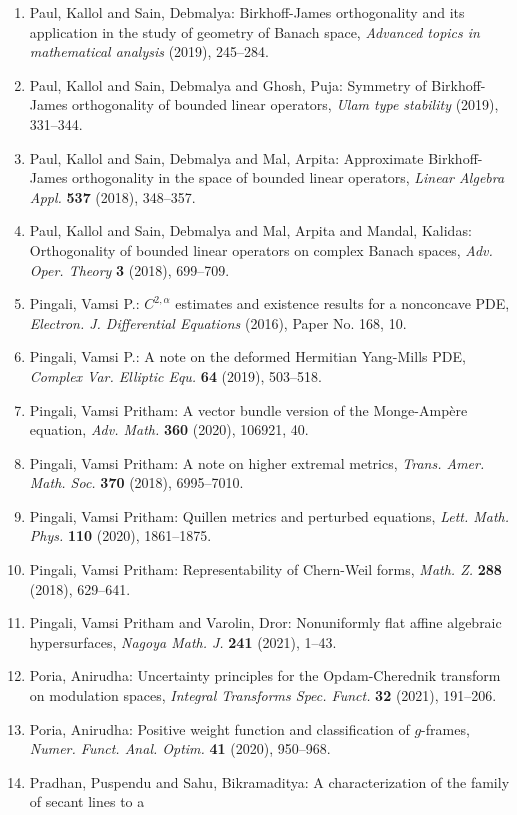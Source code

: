 \begin{enumerate}
\item Paul, Kallol and Sain, Debmalya: Birkhoff-{J}ames orthogonality and its application in the
study of geometry of {B}anach space, \emph{Advanced topics in mathematical analysis} {\bf } (2019), 245--284.
\item Paul, Kallol and Sain, Debmalya and Ghosh, Puja: Symmetry of {B}irkhoff-{J}ames orthogonality of bounded linear
operators, \emph{Ulam type stability} {\bf } (2019), 331--344.
\item Paul, Kallol and Sain, Debmalya and Mal, Arpita: Approximate {B}irkhoff-{J}ames orthogonality in the space of
bounded linear operators, \emph{Linear Algebra Appl.} {\bf 537} (2018), 348--357.
\item Paul, Kallol and Sain, Debmalya and Mal, Arpita and Mandal,
Kalidas: Orthogonality of bounded linear operators on complex {B}anach
spaces, \emph{Adv. Oper. Theory} {\bf 3} (2018), 699--709.
\item Pingali, Vamsi P.: {$C^{2,\alpha}$} estimates and existence results for a
nonconcave {PDE}, \emph{Electron. J. Differential Equations} {\bf } (2016), Paper No. 168, 10.
\item Pingali, Vamsi P.: A note on the deformed {H}ermitian {Y}ang-{M}ills {PDE}, \emph{Complex Var. Elliptic Equ.} {\bf 64} (2019), 503--518.
\item Pingali, Vamsi Pritham: A vector bundle version of the {M}onge-{A}mp\`ere equation, \emph{Adv. Math.} {\bf 360} (2020), 106921, 40.
\item Pingali, Vamsi Pritham: A note on higher extremal metrics, \emph{Trans. Amer. Math. Soc.} {\bf 370} (2018), 6995--7010.
\item Pingali, Vamsi Pritham: Quillen metrics and perturbed equations, \emph{Lett. Math. Phys.} {\bf 110} (2020), 1861--1875.
\item Pingali, Vamsi Pritham: Representability of {C}hern-{W}eil forms, \emph{Math. Z.} {\bf 288} (2018), 629--641.
\item Pingali, Vamsi Pritham and Varolin, Dror: Nonuniformly flat affine algebraic hypersurfaces, \emph{Nagoya Math. J.} {\bf 241} (2021), 1--43.
\item Poria, Anirudha: Uncertainty principles for the {O}pdam-{C}herednik transform
on modulation spaces, \emph{Integral Transforms Spec. Funct.} {\bf 32} (2021), 191--206.
\item Poria, Anirudha: Positive weight function and classification of {$g$}-frames, \emph{Numer. Funct. Anal. Optim.} {\bf 41} (2020), 950--968.
\item Pradhan, Puspendu and Sahu, Bikramaditya: A characterization of the family of secant lines to a

\end{enumerate}
